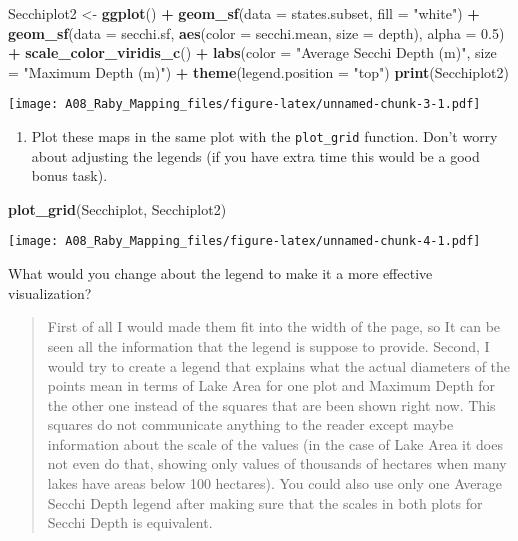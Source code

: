 \documentclass[]{article}
\newenvironment{Shaded}{\begin{snugshade}}{\end{snugshade}}
\newcommand{\DataTypeTok}[1]{\textcolor[rgb]{0.13,0.29,0.53}{#1}}
\newcommand{\FloatTok}[1]{\textcolor[rgb]{0.00,0.00,0.81}{#1}}
\newcommand{\KeywordTok}[1]{\textcolor[rgb]{0.13,0.29,0.53}{\textbf{#1}}}
\newcommand{\NormalTok}[1]{#1}
\newcommand{\OperatorTok}[1]{\textcolor[rgb]{0.81,0.36,0.00}{\textbf{#1}}}
\newcommand{\StringTok}[1]{\textcolor[rgb]{0.31,0.60,0.02}{#1}}
\providecommand{\tightlist}{%
  \setlength{\itemsep}{0pt}\setlength{\parskip}{0pt}}
\begin{document}
\begin{Shaded}
\begin{Highlighting}[]
\NormalTok{Secchiplot2 <-}\StringTok{ }\KeywordTok{ggplot}\NormalTok{() }\OperatorTok{+}
\StringTok{  }\KeywordTok{geom_sf}\NormalTok{(}\DataTypeTok{data =}\NormalTok{ states.subset, }\DataTypeTok{fill =} \StringTok{"white"}\NormalTok{) }\OperatorTok{+}
\StringTok{  }\KeywordTok{geom_sf}\NormalTok{(}\DataTypeTok{data =}\NormalTok{ secchi.sf, }\KeywordTok{aes}\NormalTok{(}\DataTypeTok{color =}\NormalTok{ secchi.mean, }\DataTypeTok{size =}\NormalTok{ depth), }
          \DataTypeTok{alpha =} \FloatTok{0.5}\NormalTok{) }\OperatorTok{+}
\StringTok{  }\KeywordTok{scale_color_viridis_c}\NormalTok{() }\OperatorTok{+}
\StringTok{  }\KeywordTok{labs}\NormalTok{(}\DataTypeTok{color =} \StringTok{"Average Secchi Depth (m)"}\NormalTok{, }\DataTypeTok{size =} \StringTok{"Maximum Depth (m)"}\NormalTok{) }\OperatorTok{+}
\StringTok{  }\KeywordTok{theme}\NormalTok{(}\DataTypeTok{legend.position =} \StringTok{"top"}\NormalTok{)}
\KeywordTok{print}\NormalTok{(Secchiplot2)}
\end{Highlighting}
\end{Shaded}

\texttt{[image: A08\_Raby\_Mapping\_files/figure-latex/unnamed-chunk-3-1.pdf]}

\begin{enumerate}
\def\labelenumi{\arabic{enumi}.}
\setcounter{enumi}{7}
\tightlist
\item
  Plot these maps in the same plot with the \texttt{plot\_grid}
  function. Don't worry about adjusting the legends (if you have extra
  time this would be a good bonus task).
\end{enumerate}

\begin{Shaded}
\begin{Highlighting}[]
\KeywordTok{plot_grid}\NormalTok{(Secchiplot, Secchiplot2)}
\end{Highlighting}
\end{Shaded}

\texttt{[image: A08\_Raby\_Mapping\_files/figure-latex/unnamed-chunk-4-1.pdf]}

What would you change about the legend to make it a more effective
visualization?

\begin{quote}
First of all I would made them fit into the width of the page, so It can
be seen all the information that the legend is suppose to provide.
Second, I would try to create a legend that explains what the actual
diameters of the points mean in terms of Lake Area for one plot and
Maximum Depth for the other one instead of the squares that are been
shown right now. This squares do not communicate anything to the reader
except maybe information about the scale of the values (in the case of
Lake Area it does not even do that, showing only values of thousands of
hectares when many lakes have areas below 100 hectares). You could also
use only one Average Secchi Depth legend after making sure that the
scales in both plots for Secchi Depth is equivalent.
\end{quote}
\end{document}
